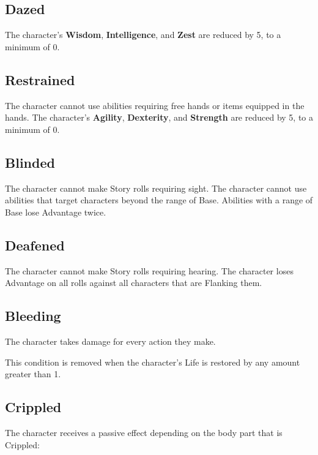 \subsection{Dazed}
The character's \textbf{Wisdom}, \textbf{Intelligence}, and \textbf{Zest} are reduced by 5,
to a minimum of 0.

\subsection{Restrained}
The character cannot use abilities requiring free hands or items equipped in the hands.
The character's \textbf{Agility}, \textbf{Dexterity}, and \textbf{Strength} are reduced by 5,
to a minimum of 0.

\subsection{Blinded}
The character cannot make Story rolls requiring sight.
The character cannot use abilities that target characters beyond the range of Base.
Abilities with a range of Base lose Advantage twice.

\subsection{Deafened}
The character cannot make Story rolls requiring hearing.
The character loses Advantage on all rolls against all characters that are Flanking them.

\subsection{Bleeding}
The character takes  damage for every action they make.

\vspace{0.4em}

This condition is removed when the character's Life is restored by any amount greater than 1.

\subsection{Crippled}
The character receives a passive effect depending on the body part that is Crippled:


